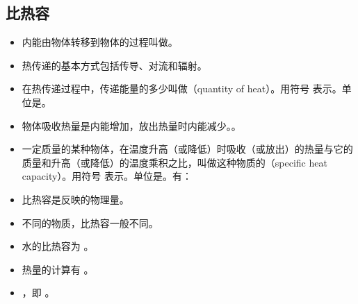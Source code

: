 \subsection{比热容}
\begin{itemize}
\item 内能由物体转移到物体的过程叫做。
\item 热传递的基本方式包括传导、对流和辐射。
\item 在热传递过程中，传递能量的多少叫做（quantity of heat）。用符号  表示。单位是。
\item 物体吸收热量是内能增加，放出热量时内能减少。。
\item 一定质量的某种物体，在温度升高（或降低）时吸收（或放出）的热量与它的质量和升高（或降低）的温度乘积之比，叫做这种物质的（specific heat capacity）。用符号  表示。单位是。有：
\item 比热容是反映的物理量。
\item 不同的物质，比热容一般不同。
\item 水的比热容为 。
\item 热量的计算有 。
\item {}，即 。
\end{itemize}